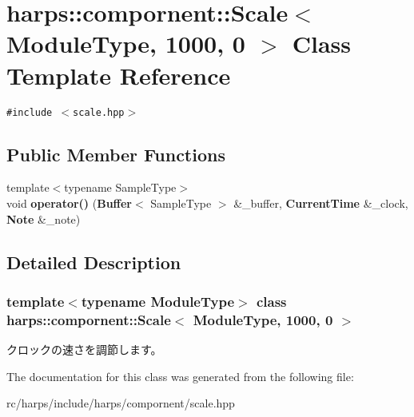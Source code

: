 \section{harps::compornent::Scale$<$ ModuleType, 1000, 0 $>$ Class Template Reference}
\label{classharps_1_1compornent_1_1Scale_3_01ModuleType_00_011000_00_010_01_4}
{\tt \#include $<$scale.hpp$>$}

\subsection*{Public Member Functions}
\begin{CompactItemize}
\item 
{\footnotesize template$<$typename SampleType$>$ }\\void \textbf{operator()} ({\bf Buffer}$<$ SampleType $>$ \&\_\-buffer, {\bf CurrentTime} \&\_\-clock, {\bf Note} \&\_\-note)\label{classharps_1_1compornent_1_1Scale_3_01ModuleType_00_011000_00_010_01_4_5769102734f8ea7c355336550c599220}

\end{CompactItemize}


\subsection{Detailed Description}
\subsubsection*{template$<$typename ModuleType$>$ class harps::compornent::Scale$<$ ModuleType, 1000, 0 $>$}

クロックの速さを調節します。 

The documentation for this class was generated from the following file:\begin{CompactItemize}
\item 
rc/harps/include/harps/compornent/scale.hpp\end{CompactItemize}
